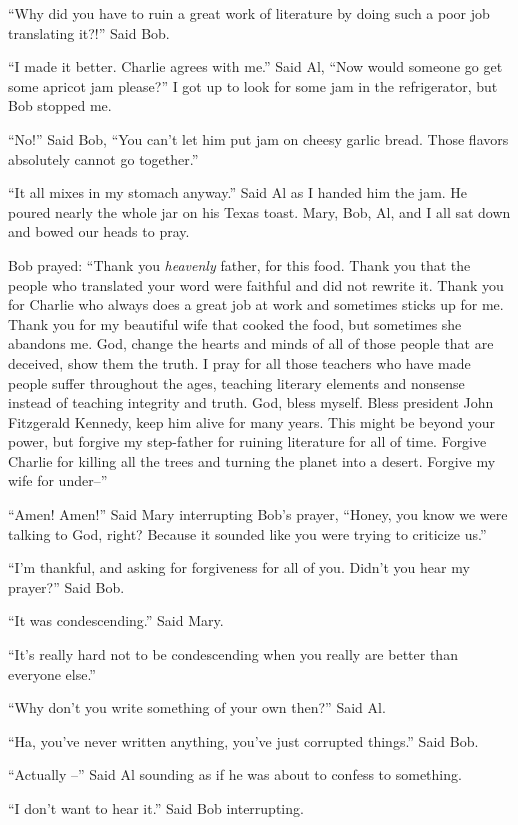 ``Why did you have to ruin a great work of literature by doing such a poor job translating it?!'' Said Bob.

``I made it better. Charlie agrees with me.'' Said Al, ``Now would someone go get some apricot jam please?'' I got up to look for some jam in the refrigerator, but Bob stopped me.

``No!'' Said Bob, ``You can't let him put jam on cheesy garlic bread. Those flavors absolutely cannot go together.''

``It all mixes in my stomach anyway.'' Said Al as I handed him the jam. He poured nearly the whole jar on his Texas toast. Mary, Bob, Al, and I all sat down and bowed our heads to pray.

Bob prayed: ``Thank you \emph{heavenly} father, for this food. Thank you that the people who translated your word were faithful and did not rewrite it. Thank you for Charlie who always does a great job at work and sometimes sticks up for me. Thank you for my beautiful wife that cooked the food, but sometimes she abandons me. God, change the hearts and minds of all of those people that are deceived, show them the truth. I pray for all those teachers who have made people suffer throughout the ages, teaching literary elements and nonsense instead of teaching integrity and truth. God, bless myself. Bless president John Fitzgerald Kennedy, keep him alive for many years. This might be beyond your power, but forgive my step-father for ruining literature for all of time. Forgive Charlie for killing all the trees and turning the planet into a desert. Forgive my wife for under--''

``Amen! Amen!'' Said Mary interrupting Bob's prayer, ``Honey, you know we were talking to God, right?
Because it sounded like you were trying to criticize us.''

``I'm thankful, and asking for forgiveness for all of you. Didn't you hear my prayer?'' Said Bob.

``It was condescending.'' Said Mary.

``It's really hard not to be condescending when you really are better than everyone else.''

``Why don't you write something of your own then?'' Said Al.

``Ha, you've never written anything, you've just corrupted things.'' Said Bob.

``Actually --'' Said Al sounding as if he was about to confess to something.

``I don't want to hear it.'' Said Bob interrupting.

